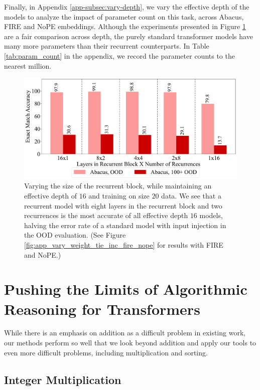 \documentclass{article}
\begin{document}
Finally, in Appendix \ref{app-subsec:vary-depth}, we vary the effective depth of the models to analyze the impact of parameter count on this task, across Abacus, FIRE and NoPE embeddings.
Although the experiments presented in Figure \ref{fig:add_vary_weight_tie} are a fair comparison across depth, the purely standard transformer models have many more parameters than their recurrent counterparts.
In Table \ref{tab:param_count} in the appendix, we record the parameter counts to the nearest million.

\begin{figure}[]
    \centering
    \includegraphics[width=\textwidth]{Figures/plot_four_recycle_only_2_bars.pdf}
    \caption{
    Varying the size of the recurrent block, while maintaining an effective depth of \(16\) and training on size \(20\) data. 
    We see that a recurrent model with eight layers in the recurrent block and two recurrences is the most accurate of all effective depth \(16\) models, halving the error rate of a standard model with input injection in the OOD evaluation. (See Figure \ref{fig:app_vary_weight_tie_inc_fire_nope} for results with FIRE and NoPE.)
    }
    \label{fig:add_vary_weight_tie}
\end{figure}


\section{Pushing the Limits of Algorithmic Reasoning for Transformers}

While there is an emphasis on addition as a difficult problem in existing work, our methods perform so well that we look beyond addition and apply our tools to even more difficult problems, including multiplication and sorting.

\subsection{Integer Multiplication}
\end{document}
